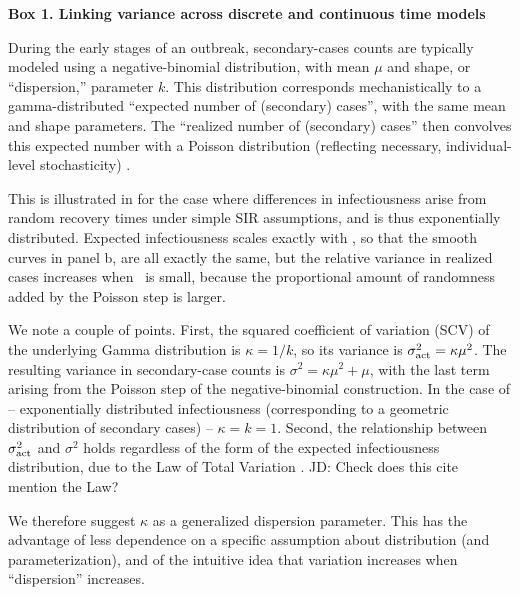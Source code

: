 \newpage
\begin{framed}
\noindent\textbf{Box 1. Linking variance across discrete and continuous time models} 

During the early stages of an outbreak, secondary-cases counts are typically modeled using a negative-binomial distribution, with mean $\mu$ and shape, or “dispersion,” parameter $k$. 
This distribution corresponds mechanistically to a gamma-distributed  “expected number of (secondary) cases”, with the same mean and shape parameters. The “realized number of (secondary) cases” then convolves this expected number with a Poisson distribution (reflecting necessary, individual-level stochasticity) \cite{lloydsmith2005superspreading}.

This is illustrated in  for the case where differences in infectiousness arise from random recovery times under simple SIR assumptions, and is thus exponentially distributed. Expected infectiousness scales exactly with \Ro, so that the smooth curves in panel b, are all exactly the same, but the relative variance in realized cases increases when \Ro\ is small, because the proportional amount of randomness added by the Poisson step is larger.

We note a couple of points. First, the squared coefficient of variation (SCV) of the underlying Gamma distribution is $\kappa=1/k$, so its variance is $\sigma_\mathrm{act}^2 = \kappa \mu^2$. The resulting variance in secondary-case counts is $\sigma^2 = \kappa\mu^2 + \mu$, with the last term arising from the Poisson step of the negative-binomial construction.
In the case of  -- exponentially distributed infectiousness (corresponding to a geometric distribution of secondary cases) -- $\kappa = k = 1$.
Second, the relationship between $\sigma_\mathrm{act}^2$ and $\sigma^2$ holds regardless of the form of the expected infectiousness distribution, due to the Law of Total Variation \cite{kuba2016moment}. JD: Check does this cite mention the Law?

We therefore suggest $\kappa$ as a generalized dispersion parameter. This has the advantage of less dependence on a specific assumption about distribution (and parameterization), and of the intuitive idea that variation increases when “dispersion” increases.


\end{framed}

